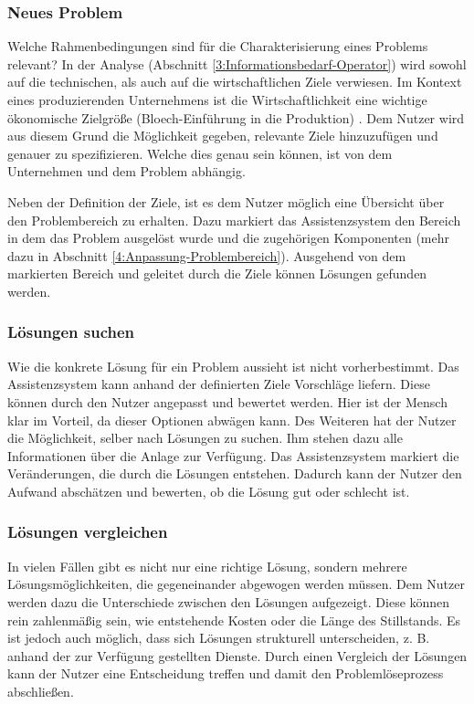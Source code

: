 \subsubsection*{Neues Problem}
Welche Rahmenbedingungen sind für die Charakterisierung eines Problems relevant? In der Analyse (Abschnitt \ref{3:Informationsbedarf-Operator}) wird sowohl auf die technischen, als auch auf die wirtschaftlichen Ziele verwiesen. Im Kontext eines produzierenden Unternehmens ist die Wirtschaftlichkeit eine wichtige ökonomische Zielgröße \cite{} (Bloech-Einführung in die Produktion) . Dem Nutzer wird aus diesem Grund die Möglichkeit gegeben, relevante Ziele hinzuzufügen und genauer zu spezifizieren. Welche dies genau sein können, ist von dem Unternehmen und dem Problem abhängig.

Neben der Definition der Ziele, ist es dem Nutzer möglich eine Übersicht über den Problembereich zu erhalten. Dazu markiert das Assistenzsystem den Bereich in dem das Problem ausgelöst wurde und die zugehörigen Komponenten (mehr dazu in Abschnitt \ref{4:Anpassung-Problembereich}).
Ausgehend von dem markierten Bereich und geleitet durch die Ziele können Lösungen gefunden werden.

\subsubsection*{Lösungen suchen}
Wie die konkrete Lösung für ein Problem aussieht ist nicht vorherbestimmt. Das Assistenzsystem kann anhand der definierten Ziele Vorschläge liefern. Diese können durch den Nutzer angepasst und bewertet werden. Hier ist der Mensch klar im Vorteil, da dieser Optionen abwägen kann. Des Weiteren hat der Nutzer die Möglichkeit, selber nach Lösungen zu suchen. Ihm stehen dazu alle Informationen über die Anlage zur Verfügung. Das Assistenzsystem markiert die Veränderungen, die durch die Lösungen entstehen. Dadurch kann der Nutzer den Aufwand abschätzen und bewerten, ob die Lösung gut oder schlecht ist.

\subsubsection*{Lösungen vergleichen}
In vielen Fällen gibt es nicht nur eine richtige Lösung, sondern mehrere Lösungsmöglichkeiten, die gegeneinander abgewogen werden müssen. Dem Nutzer werden dazu die Unterschiede zwischen den Lösungen aufgezeigt. Diese können rein zahlenmäßig sein, wie entstehende Kosten oder die Länge des Stillstands. Es ist jedoch auch möglich, dass sich Lösungen strukturell unterscheiden, z. B. anhand der zur Verfügung gestellten Dienste. Durch einen Vergleich der Lösungen kann der Nutzer eine Entscheidung treffen und damit den Problemlöseprozess abschließen.

